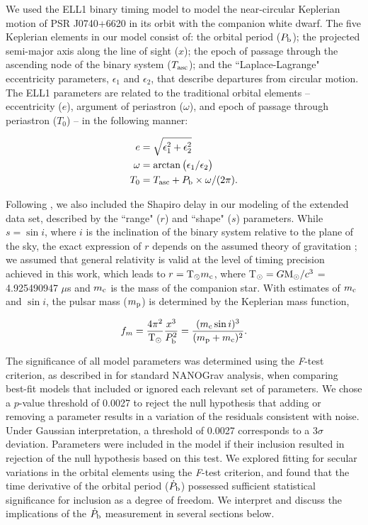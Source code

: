 \documentclass[twocolumn]{aastex63}
\newcommand{\pbdot}{$\dot{P}_{\rm b}$}
\begin{document}
We used the ELL1 binary timing model \citep{lcw+01} to model the near-circular Keplerian motion of PSR J0740+6620 in its orbit with the companion white dwarf. The five Keplerian elements in our model consist of: the orbital period ($P_{\rm b}$); the projected semi-major axis along the line of sight ($x$); the epoch of passage through the ascending node of the binary system ($T_{\rm asc}$); and the ``Laplace-Lagrange" eccentricity parameters, $\epsilon_1$ and $\epsilon_2$, that describe departures from circular motion. The ELL1 parameters are related to the traditional orbital elements -- eccentricity ($e$), argument of periastron ($\omega$), and epoch of passage through periastron ($T_0$) -- in the following manner:

\begin{align}
    e &= \sqrt{\epsilon_1^2 + \epsilon_2^2} \\
    \omega &= \arctan{\big(\epsilon_1/\epsilon_2\big)} \\
    T_0 &= T_{\rm asc} + P_{\rm b} \times \omega / (2\pi).
\end{align}

\noindent Following \citet{cfr+20}, we also included the Shapiro delay in our modeling of the extended data set, described by the ``range" ($r$) and ``shape" ($s$) parameters. While $s = \sin i$, where $i$ is the inclination of the binary system relative to the plane of the sky, the exact expression of $r$ depends on the assumed theory of gravitation \citep{dt92}; we assumed that general relativity is valid at the level of timing precision achieved in this work, which leads to $r = {\rm T}_\odot m_{\rm c}$, where T$_\odot = G{\rm M}_\odot/c^3$ = 4.925490947 $\mu$s and $m_{\rm c}$ is the mass of the companion star. With estimates of $m_{\rm c}$ and $\sin i$, the pulsar mass ($m_{\rm p}$) is determined by the Keplerian mass function,

\begin{equation}
    \label{eq:massfunc}
    f_m = \frac{4\pi^2}{{\rm T}_\odot}\frac{x^3}{P_{\rm b}^2} = \frac{(m_{\rm c}\sin i)^3}{(m_{\rm p} + m_{\rm c})^2}.
\end{equation}

The significance of all model parameters was determined using the {\it F}-test criterion, as described in \citet{aab+21a} for standard NANOGrav analysis, when comparing best-fit models that included or ignored each relevant set of parameters. We chose a $p$-value threshold of 0.0027 to reject the null hypothesis that adding or removing a parameter results in a variation of the residuals consistent with noise. Under Gaussian interpretation, a threshold of 0.0027 corresponds to a $3\sigma$ deviation.  Parameters were included in the model if their inclusion resulted in rejection of the null hypothesis based on this test. We explored fitting for secular variations in the orbital elements using the {\it F}-test criterion, and found that the time derivative of the orbital period (\pbdot) possessed sufficient statistical significance for inclusion as a degree of freedom. We interpret and discuss the implications of the \pbdot{} measurement in several sections below.
\end{document}
